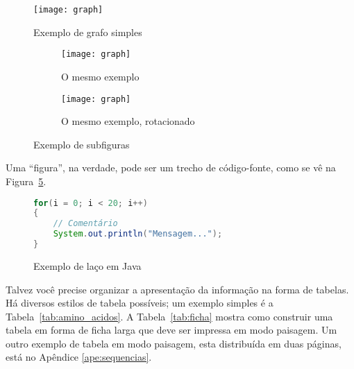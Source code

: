 \begin{figure}
  \centering
  \texttt{[image: graph]}
  \caption{Exemplo de grafo simples}
  \label{fig:humanbeta}
\end{figure}

\begin{figure}
  \centering
  \begin{subfigure}{0.4\textwidth}
    \texttt{[image: graph]}
    \caption{O mesmo exemplo}
    \label{fig:subfigures:a}
  \end{subfigure}
  \begin{subfigure}{0.4\textwidth}
    \begin{turn}{90}
      \texttt{[image: graph]}
    \end{turn}
    \caption{O mesmo exemplo, rotacionado}
    \label{fig:subfigures:b}
  \end{subfigure}
  \caption{Exemplo de subfiguras}
  \label{fig:subfigures}
\end{figure}

Uma ``figura'', na verdade, pode ser um trecho de código-fonte, como se vê na
Figura~\ref{fig:java}.

\begin{figure}
  \centering
\begin{lstlisting}[language=Java, style=wider]
for(i = 0; i < 20; i++)
{
	// Comentário
	System.out.println("Mensagem...");
}
\end{lstlisting}
  \caption{Exemplo de laço em Java}
  \label{fig:java}
\end{figure}

Talvez você precise organizar a apresentação da informação na forma de
tabelas. Há diversos estilos de tabela possíveis; um
exemplo simples é a Tabela~\ref{tab:amino_acidos}. A
Tabela~\ref{tab:ficha} mostra como construir uma tabela em forma de
ficha larga que deve ser impressa em modo paisagem. Um outro exemplo
de tabela em modo paisagem, esta distribuída em duas páginas, está no
Apêndice \ref{ape:sequencias}.

